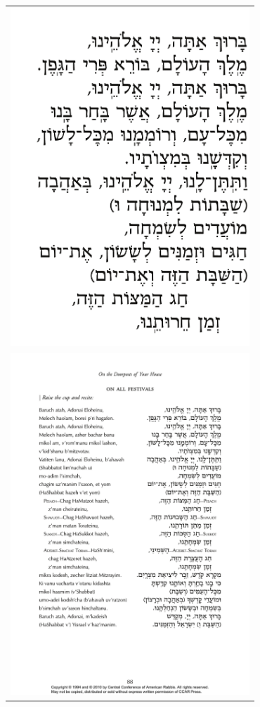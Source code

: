 \documentclass[extrafontsizes,twoside,17pt,a4paper,openany]{memoir}
\begin{document}
\begin{tabular}{r}
\includegraphics[width=9cm,trim=0 16mm 0 0]{figs/0A020-kiddush1}\\
\includegraphics[width=9cm]{figs/0A024-kiddush2}\\
\end{tabular}
\end{document}

